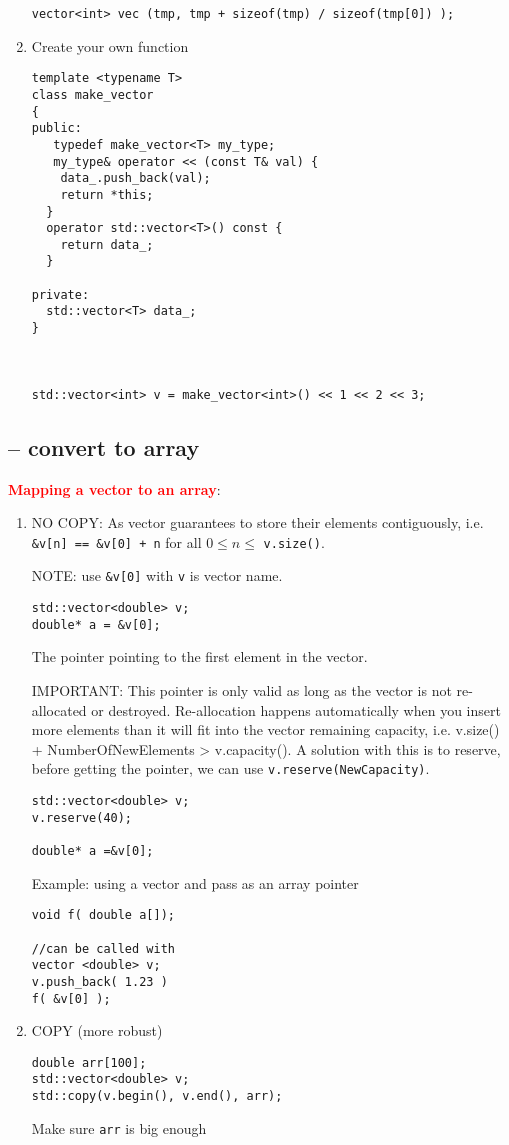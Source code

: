 \begin{enumerate}
\begin{verbatim}
vector<int> vec (tmp, tmp + sizeof(tmp) / sizeof(tmp[0]) );
\end{verbatim}

 \item Create your own function
\begin{verbatim}
template <typename T>
class make_vector
{
public:
   typedef make_vector<T> my_type;
   my_type& operator << (const T& val) {
   	data_.push_back(val);
    return *this;
  }
  operator std::vector<T>() const {
    return data_;
  }
  
private:
  std::vector<T> data_;
}



std::vector<int> v = make_vector<int>() << 1 << 2 << 3;
\end{verbatim}
\end{enumerate}

\subsection{-- convert to array}

\textcolor{red}{\bf Mapping a vector to an array}: 



\begin{enumerate}
  \item NO COPY: As vector guarantees to store their elements contiguously, i.e.
  \verb!&v[n] == &v[0] + n! for all $0\le n\le$ \verb!v.size()!. 
  
NOTE: use \verb!&v[0]! with \verb!v! is vector name.
\begin{verbatim}
std::vector<double> v;
double* a = &v[0];
\end{verbatim}
The pointer pointing to the first element in the vector.

IMPORTANT: This pointer is only valid as long as the vector is not re-allocated
or destroyed. Re-allocation happens automatically when you insert more elements
than it will fit into the vector remaining capacity, i.e. v.size() +
NumberOfNewElements >  v.capacity(). A solution with this is to reserve, before
getting the pointer, we can use \verb!v.reserve(NewCapacity)!.
\begin{verbatim}
std::vector<double> v;
v.reserve(40);

double* a =&v[0];
\end{verbatim}
  
Example: using a vector and pass as an array pointer
\begin{verbatim}
void f( double a[]);

//can be called with
vector <double> v;
v.push_back( 1.23 )
f( &v[0] );
\end{verbatim}
 

 \item COPY (more robust)
 
\begin{verbatim}
double arr[100];
std::vector<double> v;
std::copy(v.begin(), v.end(), arr);
\end{verbatim}
Make sure \verb!arr! is big enough

\end{enumerate}

